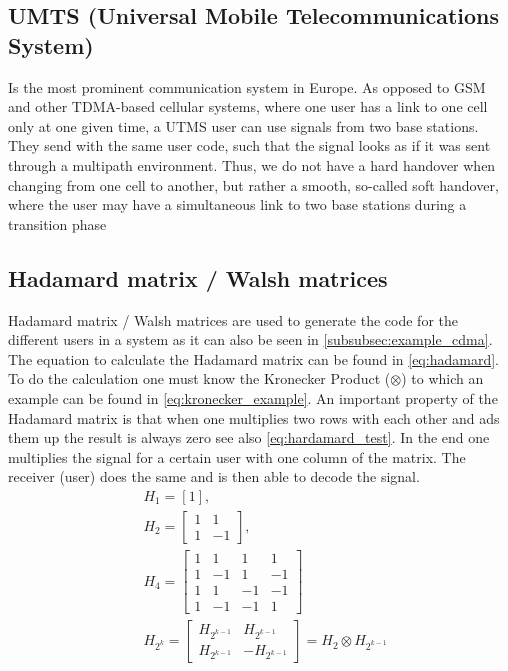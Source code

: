 \subsection{UMTS (Universal Mobile Telecommunications System)}
Is the most prominent communication system in Europe. As opposed to GSM and other TDMA-based cellular systems, where one user has a link to one cell only at one given time, a UTMS user can use signals from two base stations. They send with the same user code, such that the signal looks as if it was sent through a multipath environment. Thus, we do not have a hard handover when changing from one cell to another, but rather a smooth, so-called soft handover, where the user may have a simultaneous link to two base stations during a transition phase
\subsection{Hadamard matrix / Walsh matrices}
Hadamard matrix / Walsh matrices are used to generate the code for the different users in a system as it can also be seen in \autoref{subsubsec:example_cdma}.
The equation to calculate the Hadamard matrix can be found in \autoref{eq:hadamard}. To do the calculation one must know the Kronecker Product ($\otimes$) to which an example can be found in \autoref{eq:kronecker_example}. An important property of the Hadamard matrix is that when one multiplies two rows with each other and ads them up the result is always zero see also \autoref{eq:hardamard_test}. In the end one multiplies the signal for a certain user with one column of the matrix. The receiver (user) does the same and is then able to decode the signal.
\begin{equation} \label{eq:hadamard}
\begin{aligned}
&H_1=[1],\\
&H_2=\left[\begin{array}{cc}
1 & 1 \\
1 & -1
\end{array}\right] \text {, }\\
&H_4=\left[\begin{array}{cccc}
1 & 1 & 1 & 1 \\
1 & -1 & 1 & -1 \\
1 & 1 & -1 & -1 \\
1 & -1 & -1 & 1
\end{array}\right]\\
&H_{2^k}=\left[\begin{array}{cc}
H_{2^{k-1}} & H_{2^{k-1}} \\
H_{2^{k-1}} & -H_{2^{k-1}}
\end{array}\right]=H_2 \otimes H_{2^{k-1}}
\end{aligned}
\end{equation}
